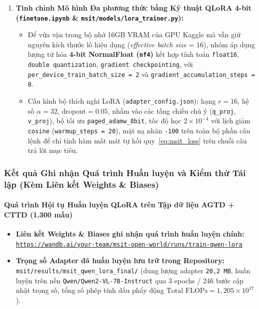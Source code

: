\documentclass[conference,10pt]{IEEEtran}
\newcommand{\WandBTrainURL}{https://wandb.ai/your-team/msit-open-world/runs/train-qwen-lora}
\begin{document}
\begin{enumerate}
\begin{itemize}
\begin{itemize}
            \item \textbf{Tập huấn luyện CTTD (\texttt{cttd\_train.jsonl}):} Gồm đúng \textbf{300 mẫu} suy luận 5 bước phân bố đều trên 4 ngành hàng (mỗi ngành hàng 75 mẫu), đảm bảo \textbf{cân bằng tuyệt đối nhãn gốc (\texttt{cttd\_label}) với 150 mẫu dương (\texttt{yes}) và 150 mẫu âm (\texttt{no})}.
            \item \textbf{Tập kiểm thử (\texttt{test\_set.jsonl}):} Gồm \textbf{1.000 mẫu} (250 mẫu/ngành hàng).
        \end{itemize}
    \end{itemize}
    \item \textbf{Tinh chỉnh Mô hình Đa phương thức bằng Kỹ thuật QLoRA 4-bit (\texttt{finetune.ipynb} \& \texttt{msit/models/lora\_trainer.py}):}
    \begin{itemize}
        \item Để vừa vặn trong bộ nhớ 16GB VRAM của GPU Kaggle mà vẫn giữ nguyên kích thước lô hiệu dụng (\textit{effective batch size} = 16), nhóm áp dụng lượng tử hóa \textbf{4-bit NormalFloat (\texttt{nf4})} kết hợp tính toán \texttt{float16}, \texttt{double quantization}, \texttt{gradient checkpointing}, với \texttt{per\_device\_train\_batch\_size = 2} và \texttt{gradient\_accumulation\_steps = 8}.
        \item Cấu hình bộ thích nghi LoRA (\texttt{adapter\_config.json}): hạng $r = 16$, hệ số $\alpha = 32$, $\text{dropout} = 0.05$, nhắm vào các tầng chiếu chú ý (\texttt{q\_proj}, \texttt{v\_proj}), bộ tối ưu \texttt{paged\_adamw\_8bit}, tốc độ học $2 \times 10^{-4}$ với lịch giảm \texttt{cosine} (\texttt{warmup\_steps = 20}), mặt nạ nhãn \texttt{-100} trên toàn bộ phần câu lệnh để chỉ tính hàm mất mát tự hồi quy~\eqref{eq:msit_loss} trên chuỗi câu trả lời mục tiêu.
    \end{itemize}
\end{enumerate}

\subsubsection{Kết quả Ghi nhận Quá trình Huấn luyện và Kiểm thử Tái lập (Kèm Liên kết Weights \& Biases)}

\paragraph{Quá trình Hội tụ Huấn luyện QLoRA trên Tập dữ liệu AGTD + CTTD (1.300 mẫu)}
\begin{itemize}
    \item \textbf{Liên kết Weights \& Biases ghi nhận quá trình huấn luyện chính:} \href{\WandBTrainURL}{\texttt{\WandBTrainURL}}
    \item \textbf{Trọng số Adapter đã huấn luyện lưu trữ trong Repository:} \texttt{msit/results/msit\_qwen\_lora\_final/} (dung lượng adapter \texttt{20,2 MB}, huấn luyện trên nền \texttt{Qwen/Qwen2-VL-7B-Instruct} qua 3 epochs / 246 bước cập nhật trọng số, tổng số phép tính dấu phẩy động $\text{Total FLOPs} = 1,205 \times 10^{17}$).
\end{itemize}
\end{document}
